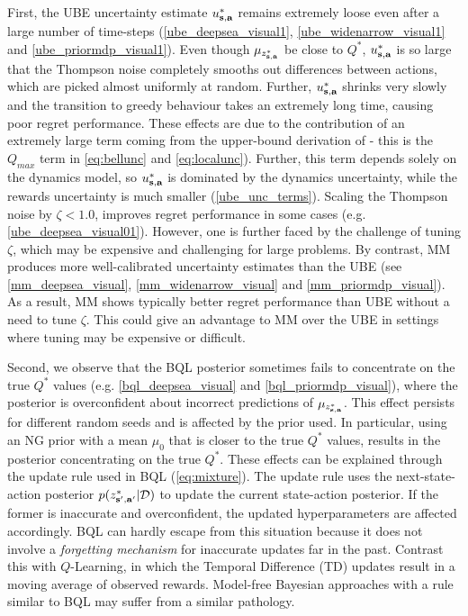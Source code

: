 \documentclass{article}
\begin{document}
First, the UBE uncertainty estimate $u^*_{\mathbf{s}, \mathbf{a}}$ remains extremely loose even after a large number of time-steps (\cref{ube_deepsea_visual1}, \cref{ube_widenarrow_visual1} and \cref{ube_priormdp_visual1}). Even though $\mu_{z^*_{\mathbf{s}, \mathbf{a}}}$ be close to $Q^*$, $u^*_{\mathbf{s}, \mathbf{a}}$ is so large that the Thompson noise completely smooths out differences between actions, which are picked almost uniformly at random. Further, $u^*_{\mathbf{s}, \mathbf{a}}$ shrinks very slowly and the transition to greedy behaviour takes an extremely long time, causing poor regret performance. These effects are due to the contribution of an extremely large term coming from the upper-bound derivation of \cite{ube} - this is the $Q_{max}$ term in \cref{eq:bellunc} and \cref{eq:localunc}). Further, this term depends solely on the dynamics model, so $u^*_{\mathbf{s}, \mathbf{a}}$ is dominated by the dynamics uncertainty, while the rewards uncertainty is much smaller (\cref{ube_unc_terms}). Scaling the Thompson noise by $\zeta < 1.0$, improves regret performance in some cases (e.g. \cref{ube_deepsea_visual01}). However, one is further faced by the challenge of tuning $\zeta$, which may be expensive and challenging for large problems. By contrast, MM produces more well-calibrated uncertainty estimates than the UBE (see \cref{mm_deepsea_visual}, \cref{mm_widenarrow_visual} and \cref{mm_priormdp_visual}). As a result, MM shows typically better regret performance than UBE without a need to tune $\zeta$. This could give an advantage to MM over the UBE in settings where tuning may be expensive or difficult.

Second, we observe that the BQL posterior sometimes fails to concentrate on the true $Q^*$ values (e.g. \cref{bql_deepsea_visual} and \cref{bql_priormdp_visual}), where the posterior is overconfident about incorrect predictions of $\mu_{z^*_{\mathbf{s}, \mathbf{a}}}$. This effect persists for different random seeds and is affected by the prior used. In particular, using an NG prior with a mean $\mu_0$ that is closer to the true $Q^*$ values, results in the posterior concentrating on the true $Q^*$. These effects can be explained through the update rule used in BQL (\cref{eq:mixture}). The update rule uses the next-state-action posterior $p(z^*_{\mathbf{s}', \mathbf{a}'} | \mathcal{D})$ to update the current state-action posterior. If the former is inaccurate and overconfident, the updated hyperparameters are affected accordingly. BQL can hardly escape from this situation because it does not involve a \textit{forgetting mechanism} for inaccurate updates far in the past. Contrast this with $Q$-Learning, in which the Temporal Difference (TD) updates result in a moving average of observed rewards. Model-free Bayesian approaches with a rule similar to BQL may suffer from a similar pathology.
\end{document}
